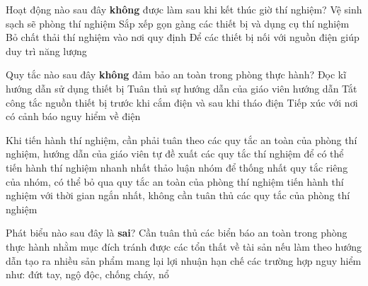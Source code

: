 \begin{ex}%
Hoạt động nào sau đây \textbf{không} được làm sau khi kết thúc giờ thí nghiệm?
\choice
{Vệ sinh sạch sẽ phòng thí nghiệm}
{Sắp xếp gọn gàng các thiết bị và dụng cụ thí nghiệm}
{Bỏ chất thải thí nghiệm vào nơi quy định}
{\True Để các thiết bị nối với nguồn điện giúp duy trì năng lượng}
\end{ex}

\begin{ex}%
Quy tắc nào sau đây \textbf{không} đảm bảo an toàn trong phòng thực hành?
\choice
{Đọc kĩ hướng dẫn sử dụng thiết bị}
{Tuân thủ sự hướng dẫn của giáo viên hướng dẫn}
{Tắt công tắc nguồn thiết bị trước khi cắm điện và sau khi tháo điện}
{\True Tiếp xúc với nơi có cảnh báo nguy hiểm về điện}	
\end{ex}

\begin{ex}%
Khi tiến hành thí nghiệm, cần phải
\choice
{\True tuân theo các quy tắc an toàn của phòng thí nghiệm, hướng dẫn của giáo viên}
{tự đề xuất các quy tắc thí nghiệm để có thể tiến hành thí nghiệm nhanh nhất}
{thảo luận nhóm để thống nhất quy tắc riêng của nhóm, có thể bỏ qua quy tắc an toàn của phòng thí nghiệm}
{tiến hành thí nghiệm với thời gian ngắn nhất, không cần tuân thủ các quy tắc của phòng thí nghiệm}
\end{ex}

\begin{ex}%
Phát biểu nào sau đây là \textbf{sai}? Cần tuân thủ các biển báo an toàn trong phòng thực hành nhằm mục đích
\choice
{tránh được các tổn thất về tài sản nếu làm theo hướng dẫn}
{\True tạo ra nhiều sản phẩm mang lại lợi nhuận}
{hạn chế các trường hợp nguy hiểm như: đứt tay, ngộ độc,}
{chống cháy, nổ}

\end{ex}



